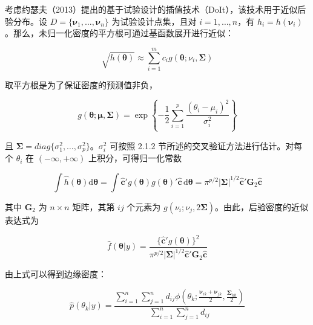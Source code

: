 \documentclass{ctexart}
\begin{document}
考虑约瑟夫（2013）提出的基于试验设计的插值技术（DoIt），该技术用于近似后验分布。设 $D = \{\boldsymbol{\nu}_1, \dots, \boldsymbol{\nu}_n\}$ 为试验设计点集，且对 $i=1,\dots,n$，有 $h_i = h(\boldsymbol{\nu}_i)$。那么，未归一化密度的平方根可通过基函数展开进行近似：

\begin{equation*}
\sqrt{h(\boldsymbol{\theta})} \approx \sum_{i=1}^{m} c_i g(\boldsymbol{\theta}; \nu_i, \boldsymbol{\Sigma})
\tag{4.50}
\end{equation*}

取平方根是为了保证密度的预测值非负，

\begin{equation*}
g(\boldsymbol{\theta}; \boldsymbol{\mu}, \boldsymbol{\Sigma}) = \exp\left\{ -\frac12\sum_{i=1}^{p}\frac{(\theta_i-\mu_i)^2}{\sigma_i^2} \right\}
\end{equation*}

且 $\boldsymbol{\Sigma} = diag\{\sigma_1^2,\dots,\sigma_p^2\}$。$\sigma_i^2$ 可按照 2.1.2 节所述的交叉验证方法进行估计。对每个 $\theta_i$ 在 $(-\infty,+\infty)$ 上积分，可得归一化常数

\begin{equation*}
\int \widehat h(\boldsymbol{\theta})\mathrm{d}\boldsymbol{\theta} = \int \widehat{\boldsymbol{c}}'g(\boldsymbol{\theta})g(\boldsymbol{\theta})'\widehat{\boldsymbol{c}} \,\mathrm{d}\boldsymbol{\theta} = \pi^{p/2}|\boldsymbol{\Sigma}|^{1/2}\widehat{\boldsymbol{c}}'\boldsymbol{G}_2\widehat{\boldsymbol{c}}
\tag{4.51}
\end{equation*}

其中 $\boldsymbol{G}_2$ 为 $n\times n$ 矩阵，其第 $ij$ 个元素为 $g(\nu_i;\nu_j,2\boldsymbol{\Sigma})$。由此，后验密度的近似表达式为

\begin{equation*}
\widehat f(\boldsymbol{\theta}|y) = \frac{\{\widehat{\boldsymbol{c}}'g(\boldsymbol{\theta})\}^2}{\pi^{p/2}|\boldsymbol{\Sigma}|^{1/2}\widehat{\boldsymbol{c}}'\boldsymbol{G}_2\widehat{\boldsymbol{c}}}
\tag{4.52}
\end{equation*}

由上式可以得到边缘密度：

\begin{equation*}
\widehat p(\theta_k|y) = \frac{\sum_{i=1}^{n}\sum_{j=1}^{n} d_{ij}\phi\left(\theta_k;\frac{\boldsymbol{\nu}_{ik}+\boldsymbol{\nu}_{jk}}{2},\frac{\boldsymbol{\Sigma}_{kk}}{2}\right)}{\sum_{i=1}^{n}\sum_{j=1}^{n} d_{ij}}
\tag{4.53}
\end{equation*}
\end{document}
